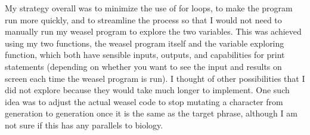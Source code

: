 \documentclass[12pt, letterpaper]{article}
\begin{document}
My strategy overall was to minimize the use of for loops, to make the program run more quickly, and to streamline the process so that I would not need to manually run my weasel program to explore the two variables. This was achieved using my two functions, the weasel program itself and the variable exploring function, which both have sensible inputs, outputs, and capabilities for print statements (depending on whether you want to see the input and results on screen each time the weasel program is run). I thought of other possibilities that I did not explore because they would take much longer to implement. One such idea was to adjust the actual weasel code to stop mutating a character from generation to generation once it is the same as the target phrase, although I am not sure if this has any parallels to biology.
\end{document}
